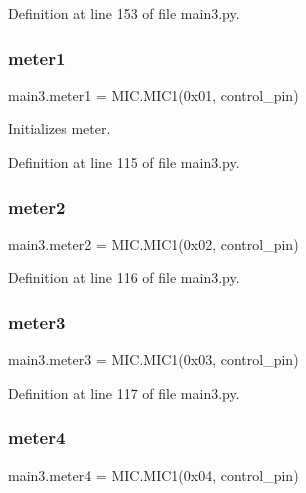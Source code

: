 Definition at line 153 of file main3.\+py.

\mbox{\label{namespacemain3_a6a802b14dd2a75c3e2b040097e50711a}} 
\subsubsection{\texorpdfstring{meter1}{meter1}}
{\footnotesize\ttfamily main3.\+meter1 = M\+I\+C.\+M\+I\+C1(0x01, control\+\_\+pin)}



Initializes meter. 



Definition at line 115 of file main3.\+py.

\mbox{\label{namespacemain3_aa252e5a293824baa2daad9b2dbef9b11}} 
\subsubsection{\texorpdfstring{meter2}{meter2}}
{\footnotesize\ttfamily main3.\+meter2 = M\+I\+C.\+M\+I\+C1(0x02, control\+\_\+pin)}



Definition at line 116 of file main3.\+py.

\mbox{\label{namespacemain3_a70657f222edd8805f6f49ad404bd875a}} 
\subsubsection{\texorpdfstring{meter3}{meter3}}
{\footnotesize\ttfamily main3.\+meter3 = M\+I\+C.\+M\+I\+C1(0x03, control\+\_\+pin)}



Definition at line 117 of file main3.\+py.

\mbox{\label{namespacemain3_a80e6d1df977908ba5ce55b4beb384ce6}} 
\subsubsection{\texorpdfstring{meter4}{meter4}}
{\footnotesize\ttfamily main3.\+meter4 = M\+I\+C.\+M\+I\+C1(0x04, control\+\_\+pin)}



